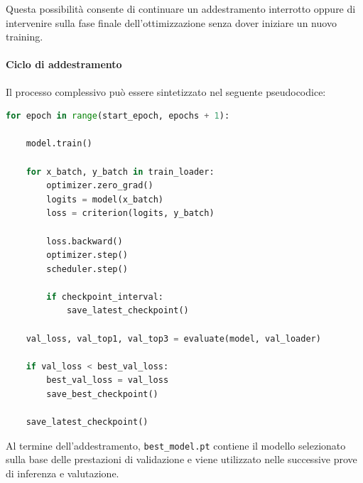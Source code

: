 Questa possibilità consente di continuare un addestramento interrotto oppure di intervenire sulla fase finale dell'ottimizzazione senza dover iniziare un nuovo training.

\paragraph{Ciclo di addestramento}

Il processo complessivo può essere sintetizzato nel seguente pseudocodice:

\begin{lstlisting}[language=Python, caption={Schema semplificato del processo di addestramento}, label={lst:training_loop}]
for epoch in range(start_epoch, epochs + 1):

    model.train()

    for x_batch, y_batch in train_loader:
        optimizer.zero_grad()
        logits = model(x_batch)
        loss = criterion(logits, y_batch)

        loss.backward()
        optimizer.step()
        scheduler.step()

        if checkpoint_interval:
            save_latest_checkpoint()

    val_loss, val_top1, val_top3 = evaluate(model, val_loader)

    if val_loss < best_val_loss:
        best_val_loss = val_loss
        save_best_checkpoint()

    save_latest_checkpoint()
\end{lstlisting}

Al termine dell'addestramento, \texttt{best\_model.pt} contiene il modello selezionato sulla base delle prestazioni di validazione e viene utilizzato nelle successive prove di inferenza e valutazione.
